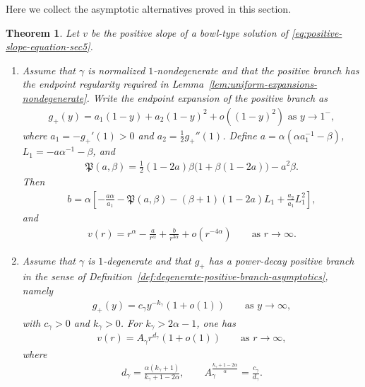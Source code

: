 \documentclass{amsart}
\theoremstyle{plain}
\newtheorem{theorem}{Theorem}[section]
\theoremstyle{mainintrothm}
\theoremstyle{definition}
\begin{document}
	Here we collect the asymptotic alternatives proved in this section.
	
	\begin{theorem}
		\label{thm:positive-bowl-asymptotics}
		Let $v$ be the positive slope of a bowl-type solution of
		\eqref{eq:positive-slope-equation-sec5}.
		
		\begin{enumerate}[label=\textup{(\roman*)}]
			\item Assume that $\gamma$ is normalized $1$-nondegenerate and that the
			positive branch has the endpoint regularity required in
			Lemma~\ref{lem:uniform-expansions-nondegenerate}.  Write the endpoint
			expansion of the positive branch as
			\begin{align*}
				g_+(y)
				=
				a_1(1-y)
				+
				a_2(1-y)^2
				+
				o((1-y)^2)\mbox{ as }y\to1^-,
			\end{align*}
			where $a_1=-g_+'(1)>0$ and $a_2=\frac{1}{2}g_+''(1)$.  Define $a= \alpha\left(\alpha a_1^{-1}-\beta\right)$, $L_1=-a\alpha^{-1}-\beta$,
			and
			\begin{align*}
				\mathfrak P(a,\beta)
				=
				\frac{1}{2}(1-2a)\beta
				\bigl(1+\beta(1-2a)\bigr)
				-
				a^2\beta.
			\end{align*}
			Then
			\begin{align*}
				b
				=
				\alpha
				\left[
				-\frac{a\alpha}{a_1}
				-
				\mathfrak P(a,\beta)
				-
				(\beta+1)(1-2a)L_1
				+
				\frac{a_2}{a_1}L_1^2
				\right],
			\end{align*}
			and
			\begin{align*}
				v(r)
				=
				r^\alpha
				-
				\frac{a}{r^\alpha}
				+
				\frac{b}{r^{3\alpha}}
				+
				o(r^{-4\alpha})
				\qquad
				\text{as }r\to\infty.
			\end{align*}
			
		\item Assume that $\gamma$ is $1$-degenerate and that $g_+$ has a
		power-decay positive branch in the sense of
		Definition~\ref{def:degenerate-positive-branch-asymptotics}, namely
		\begin{align*}
			g_+(y)
			=
			c_\gamma y^{-k_\gamma}(1+o(1))
			\qquad
			\text{as }y\to\infty,
		\end{align*}
		with $c_\gamma>0$ and $k_\gamma>0$.  For $k_\gamma>2\alpha-1$, one has
		\begin{align*}
			v(r)
			=
			A_\gamma r^{d_\gamma}(1+o(1))
			\qquad
			\text{as }r\to\infty,
		\end{align*}
		where
		\begin{align*}
			d_\gamma
			=
			\frac{\alpha(k_\gamma+1)}{k_\gamma+1-2\alpha},
			\qquad
			A_\gamma^{\frac{k_\gamma+1-2\alpha}{\alpha}}
			=
			\frac{c_\gamma}{d_\gamma}.
		\end{align*}
		

\end{enumerate}
\end{theorem}
\end{document}
